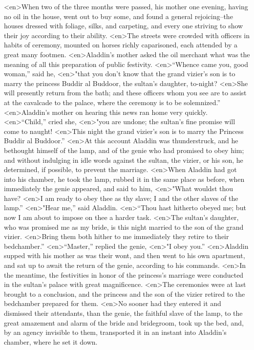 <en>When two of the three months were passed, his mother one evening, having no oil in the house, went out to buy some, and found a general rejoicing--the houses dressed with foliage, silks, and carpeting, and every one striving to show their joy according to their ability.
<en>The streets were crowded with officers in habits of ceremony, mounted on horses richly caparisoned, each attended by a great many footmen.
<en>Aladdin’s mother asked the oil merchant what was the meaning of all this preparation of public festivity.
<en>“Whence came you, good woman,” said he,
<en>"that you don’t know that the grand vizier’s son is to marry the princess Buddir al Buddoor, the sultan’s daughter, to-night?
<en>She will presently return from the bath; and these officers whom you see are to assist at the cavalcade to the palace, where the ceremony is to be solemnized.”
<en>Aladdin’s mother on hearing this news ran home very quickly.
<en>“Child,” cried she,
<en>"you are undone; the sultan’s fine promise will come to naught!
<en>This night the grand vizier’s son is to marry the Princess Buddir al Buddoor.”
<en>At this account Aladdin was thunderstruck, and he bethought himself of the lamp, and of the genie who had promised to obey him; and without indulging in idle words against the sultan, the vizier, or his son, he determined, if possible, to prevent the marriage.
<en>When Aladdin had got into his chamber, he took the lamp, rubbed it in the same place as before, when immediately the genie appeared, and said to him,
<en>"What wouldst thou have?
<en>I am ready to obey thee as thy slave; I and the other slaves of the lamp.”
<en>"Hear me,” said Aladdin.
<en>“Thou hast hitherto obeyed me; but now I am about to impose on thee a harder task.
<en>The sultan’s daughter, who was promised me as my bride, is this night married to the son of the grand vizier.
<en>Bring them both hither to me immediately they retire to their bedchamber.”
<en>“Master,” replied the genie,
<en>"I obey you.”
<en>Aladdin supped with his mother as was their wont, and then went to his own apartment, and sat up to await the return of the genie, according to his commands.
<en>In the meantime, the festivities in honor of the princess’s marriage were conducted in the sultan’s palace with great magnificence.
<en>The ceremonies were at last brought to a conclusion, and the princess and the son of the vizier retired to the bedchamber prepared for them.
<en>No sooner had they entered it and dismissed their attendants, than the genie, the faithful slave of the lamp, to the great amazement and alarm of the bride and bridegroom, took up the bed, and, by an agency invisible to them, transported it in an instant into Aladdin’s chamber, where he set it down.
